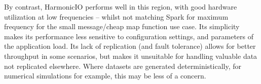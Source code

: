 \documentclass[conference]{IEEEtran}
\begin{document}
By contrast, HarmonicIO performs well in this region, with good hardware utilization at low frequencies -- whilst not matching Spark for maximum frequency for the small message/cheap map function use case. Its simplicity makes its performance less sensitive to configuration settings, and parameters of the application load. Its lack of replication (and fault tolerance) allows for better throughput in some scenarios, but makes it unsuitable for handling valuable data not replicated elsewhere. Where datasets are generated deterministically, for numerical simulations for example, this may be less of a concern.
\end{document}
